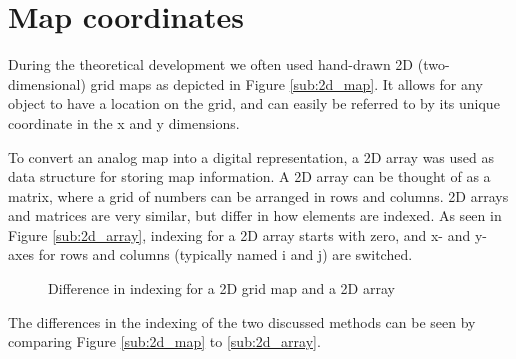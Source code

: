 \section{Map coordinates}
\label{sec:map_coordinates} %
During the theoretical development we often used hand-drawn 2D (two-dimensional) grid maps as depicted in Figure \ref{sub:2d_map}. It allows for any object to have a location on the grid, and can easily be referred to by its unique coordinate in the x and y dimensions. 

To convert an analog map into a digital representation, a 2D array was used as data structure for storing map information. A 2D array can be thought of as a matrix, where a grid of numbers can be arranged in rows and columns. 2D arrays and matrices are very similar, but differ in how elements are indexed. As seen in Figure \ref{sub:2d_array}, indexing for a 2D array starts with zero, and x- and y-axes for rows and columns (typically named i and j) are switched.  

\begin{figure}[htp]
    \centering
    \hspace{0.1\textwidth}  
    \caption{Difference in indexing for a 2D grid map and a 2D array}
    \label{fig:floor_plans}
\end{figure}

The differences in the indexing of the two discussed methods can be seen by comparing Figure \ref{sub:2d_map} to \ref{sub:2d_array}.

